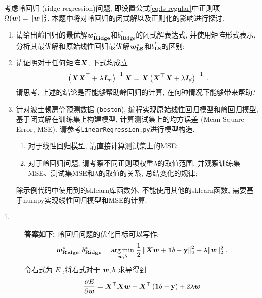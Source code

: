 \documentclass[answers]{exam}  %
\begin{document}
\begin{questions}
	考虑岭回归 (ridge regression)问题, 即设置公式\eqref{eq:ls-regular}中正则项$\Omega(\boldsymbol{w}) = \lVert \boldsymbol{w}\rVert_2^2$. 本题中将对岭回归的闭式解以及正则化的影响进行探讨.
	\begin{enumerate}
		\item 请给出岭回归的最优解$\boldsymbol{w}_{\mathbf{Ridge}}^*$和$b_{\mathbf{Ridge}}^*$的闭式解表达式, 并使用矩阵形式表示, 分析其最优解和原始线性回归最优解$\boldsymbol{w}_{\mathbf{LS}}^*$和$b_{\mathbf{LS}}^*$的区别;
		\item 请证明对于任何矩阵$\boldsymbol{X}$, 下式均成立
		      \begin{align}
			      \left(\boldsymbol{X} \boldsymbol{X}^{\top}+\lambda \boldsymbol{I}_m\right)^{-1} \boldsymbol{X}=\boldsymbol{X}\left(\boldsymbol{X}^{\top} \boldsymbol{X}+\lambda \boldsymbol{I}_d\right)^{-1}\;.
			      \label{eq:4-matrix}
		      \end{align}
		      请思考, 上述的结论是否能够帮助岭回归的计算, 在何种情况下能够带来帮助?
		\item 针对波士顿房价预测数据 (\lstinline{boston}), 编程实现原始线性回归模型和岭回归模型, 基于闭式解在训练集上构建模型, 计算测试集上的均方误差 (Mean Square Error, MSE). 请参考\lstinline{LinearRegression.py}进行模型构造.
		      
		      \begin{enumerate}
			      \item 对于线性回归模型, 请直接计算测试集上的MSE;
			      \item 对于岭回归问题, 请考察不同正则项权重$\lambda$的取值范围, 并观察训练集MSE、测试集MSE和$\lambda$的取值的关系, 总结变化的规律;
		      \end{enumerate} 除示例代码中使用到的sklearn库函数外, 不能使用其他的sklearn函数, 需要基于numpy实现线性回归模型和MSE的计算.
	\end{enumerate}
	\begin{solution}
		\begin{description}
			\item[1.] \textbf{答案如下:}
			      岭回归问题的优化目标可以写作:
			      \begin{equation*}
				      \boldsymbol{w}_{\mathbf{Ridge}}^{*}, b_{\mathbf{Ridge}}^{*}=\underset{\boldsymbol{w}, b}{\arg \min }\; \frac{1}{2}\left\|\boldsymbol{X} \boldsymbol{w}+\boldsymbol{1} b-\mathbf{y}\right\|_{2}^{2}+\lambda \| \boldsymbol{w} \|_2^2 \; .
			      \end{equation*}
			      令右式为 $E$ ,将右式对于 $\boldsymbol{w},b$ 求导得到
			      \begin{align}
				      \frac{\partial E}{\partial \vw} & =\mX^\top\mX\vw+\mX^\top\left(\ones b-\mathbf{y}\right)+2\lambda \vw\label{part:vw} \\

\end{align}
\end{description}
\end{solution}
\end{questions}
\end{document}
